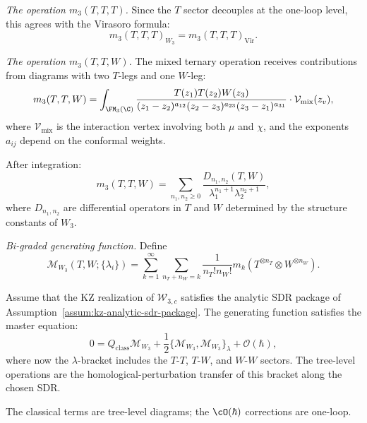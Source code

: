\medskip
\noindent\emph{The operation $m_3(T,T,T)$.}
Since the $T$ sector decouples at the one-loop level, this agrees with the Virasoro formula:
\begin{equation}
m_3(T,T,T)_{W_3} = m_3(T,T,T)_{\text{Vir}}.
\end{equation}

\medskip
\noindent\emph{The operation $m_3(T,T,W)$.}
The mixed ternary operation receives contributions from diagrams with two $T$-legs and one $W$-leg:
\begin{equation}
\label{eq:w3-m3-TTW}
m_3(T,T,W) = \int_{\FM_3(\C)} \frac{T(z_1) T(z_2) W(z_3)}{(z_1-z_2)^{a_{12}} (z_2-z_3)^{a_{23}} (z_3-z_1)^{a_{31}}} \cdot \mathcal{V}_{\text{mix}}(z_v),
\end{equation}
where $\mathcal{V}_{\text{mix}}$ is the interaction vertex involving both $\mu$ and $\chi$, and the exponents $a_{ij}$ depend on the conformal weights.

After integration:
\begin{equation}
m_3(T,T,W) = \sum_{n_1, n_2 \geq 0} \frac{D_{n_1,n_2}(T,W)}{\lambda_1^{n_1+1} \lambda_2^{n_2+1}},
\end{equation}
where $D_{n_1,n_2}$ are differential operators in $T$ and $W$ determined by the structure constants of $W_3$.

\medskip
\noindent\emph{Bi-graded generating function.}
Define
\begin{equation}
\mathcal{M}_{W_3}(T,W; \{\lambda_i\}) = \sum_{k=1}^\infty \sum_{n_T + n_W = k} \frac{1}{n_T! n_W!} m_k(T^{\otimes n_T} \otimes W^{\otimes n_W}).
\end{equation}

\begin{theorem}
\label{thm:w3-recursive}
Assume that the KZ realization of $\mathcal W_{3,c}$ satisfies the
analytic SDR package of Assumption~\ref{assum:kz-analytic-sdr-package}.
The generating function satisfies the master equation:
\begin{equation}
\label{eq:w3-master}
0 = Q_{\text{class}} \mathcal{M}_{W_3} + \frac{1}{2} \{\mathcal{M}_{W_3}, \mathcal{M}_{W_3}\}_{\lambda} + \mathcal{O}(\hbar),
\end{equation}
where now the $\lambda$-bracket includes the $T$-$T$, $T$-$W$, and $W$-$W$ sectors.
The tree-level operations are the homological-perturbation transfer
of this bracket along the chosen SDR.
\end{theorem}

The classical terms are tree-level diagrams;
the $\cO(\hbar)$ corrections are one-loop.

